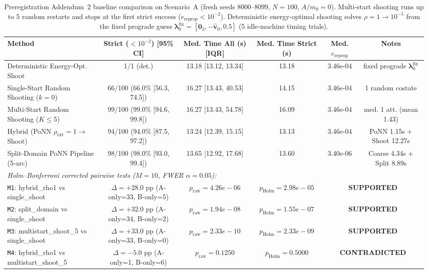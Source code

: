 \begin{table}[t]
\centering
\caption{Preregistration Addendum~2 baseline comparison on Scenario~A (fresh seeds 8000--8099, $N=100$, $A/m_0=0$). Multi-start shooting runs up to 5 random restarts and stops at the first strict success ($e_{\mathrm{reprop}} < 10^{-2}$). Deterministic energy-optimal shooting solves $\rho=1 \to 10^{-5}$ from the fixed prograde guess $\boldsymbol{\lambda}_0^{\mathrm{fix}} = [\mathbf{0}_3, -\hat{\mathbf{v}}_0, 0.5]$ (5 idle-machine timing trials).}
\label{tab:addendum2_baselines}
\begin{tabular}{lccccc}
\toprule
Method & Strict ($<10^{-2}$) [95\% CI] & Med. Time All (s) [IQR] & Med. Time Strict (s) & Med. $e_{\mathrm{reprop}}$ & Notes \\
\midrule
Deterministic Energy-Opt. Shoot & 1/1 (det.) & 13.18 [13.12, 13.34] & 13.18 & 3.46e-04 & fixed prograde $\boldsymbol{\lambda}_0^{\mathrm{fix}}$ \\
Single-Start Random Shooting ($k=0$) & 66/100 (66.0\% [56.3, 74.5]) & 16.27 [13.43, 40.53] & 14.15 & 3.46e-04 & 1 random costate \\
Multi-Start Random Shooting ($K \le 5$) & 99/100 (99.0\% [94.6, 99.8]) & 16.27 [13.43, 54.78] & 16.09 & 3.46e-04 & med. 1 att. (mean 1.43) \\
Hybrid (PoNN $\rho_{\mathrm{ext}}=1 \to$ Shoot) & 94/100 (94.0\% [87.5, 97.2]) & 13.24 [12.39, 15.15] & 13.13 & 3.46e-04 & PoNN 1.15s + Shoot 12.27s \\
Split-Domain PoNN Pipeline (5-arc) & 98/100 (98.0\% [93.0, 99.4]) & 13.65 [12.92, 17.68] & 13.60 & 3.40e-06 & Coarse 4.34s + Split 8.89s \\
\midrule
\multicolumn{6}{l}{\textit{Holm--Bonferroni corrected pairwise tests ($M=10$, FWER $\alpha=0.05$):}} \\
\texttt{M1}: hybrid\_rho1 vs single\_shoot & $\Delta=+28.0$ pp (A-only=33, B-only=5) & $p_{\mathrm{raw}}=4.26e-06$ & $p_{\mathrm{Holm}}=2.98e-05$ & \multicolumn{2}{c}{\textbf{SUPPORTED}} \\
\texttt{M2}: split\_domain vs single\_shoot & $\Delta=+32.0$ pp (A-only=34, B-only=2) & $p_{\mathrm{raw}}=1.94e-08$ & $p_{\mathrm{Holm}}=1.55e-07$ & \multicolumn{2}{c}{\textbf{SUPPORTED}} \\
\texttt{M3}: multistart\_shoot\_5 vs single\_shoot & $\Delta=+33.0$ pp (A-only=33, B-only=0) & $p_{\mathrm{raw}}=2.33e-10$ & $p_{\mathrm{Holm}}=2.33e-09$ & \multicolumn{2}{c}{\textbf{SUPPORTED}} \\
\texttt{M4}: hybrid\_rho1 vs multistart\_shoot\_5 & $\Delta=-5.0$ pp (A-only=1, B-only=6) & $p_{\mathrm{raw}}=0.1250$ & $p_{\mathrm{Holm}}=0.5000$ & \multicolumn{2}{c}{\textbf{CONTRADICTED}} \\

\end{tabular}
\end{table}
